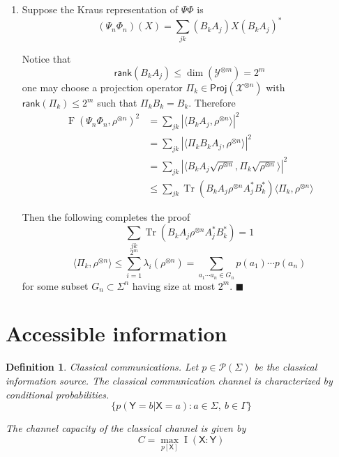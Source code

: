 \documentclass[aps,pra,onecolumn,notitlepage,superscriptaddress]{revtex4-1}
\newcommand{\reg}[1]{\mathsf{#1}}
\newcommand{\spc}[1]{\mathcal{#1}}
\newcommand{\Proj}{\mathsf{Proj}}
\newcommand{\rank}{\mathsf{rank}}
\def\>{\rangle}
\def\<{\langle}
\newcommand{\Tr}{\operatorname{Tr}}
\newcommand{\op}[1]{\operatorname{#1}}
\newtheorem{defi}{Definition}
\def\qed{$\blacksquare$ \newline}
\begin{document}
\begin{enumerate}
        \item Suppose the Kraus representation of $\Psi\Phi$ is
        \begin{equation}
            (\Psi_n\Phi_n) (X) = \sum_{jk} (B_kA_j) X (B_kA_j)^*
        \end{equation}

        Notice that
        \begin{equation}
            \rank(B_kA_j) \leq \dim(\spc Y^{\otimes m}) = 2^m
        \end{equation}
        one may choose a projection operator $\Pi_k \in \Proj(\spc X^{\otimes n})$ with $\rank(\Pi_k) \leq 2^m$ such that
        $\Pi_k B_k = B_k$. Therefore
        \begin{align*}
            \op F(\Psi_n\Phi_n, \rho^{\otimes n})^2 
            &= \sum_{jk} |\< B_kA_j, \rho^{\otimes n} \>|^2 \\
            &= \sum_{jk} |\< \Pi_kB_kA_j, \rho^{\otimes n} \>|^2 \\
            &= \sum_{jk} |\< B_kA_j\sqrt{\rho^{\otimes n}}, \Pi_k\sqrt{\rho^{\otimes n}} \>|^2 \\
            &\leq \sum_{jk} \Tr(B_kA_j \rho^{\otimes n} A_j^*B_k^*) \< \Pi_k, \rho^{\otimes n} \>
        \end{align*}

        Then the following completes the proof
        \begin{equation}
            \sum_{jk} \Tr(B_kA_j \rho^{\otimes n} A_j^* B_k^*) = 1
        \end{equation}
        \begin{equation}
            \< \Pi_k, \rho^{\otimes n} \> \leq \sum_{i=1}^{2^m} \lambda_i(\rho^{\otimes n}) = \sum_{a_1\cdots a_n \in G_n} p(a_1)\cdots p(a_n)
        \end{equation}
        for some subset $G_n \subset \Sigma^n$ having size at most $2^m$. \qed
    \end{enumerate}

    \section{Accessible information}
    \begin{defi}
        Classical communications. Let $p \in \spc P(\Sigma)$ be the classical information source. The classical communication channel is characterized by conditional probabilities.
        \begin{equation}
            \{ p(\reg Y = b | \reg X = a) : a \in \Sigma, \ b \in \Gamma \}
        \end{equation}
        
        The channel capacity of the classical channel is given by
        \begin{equation}
            C = \max_{p[\reg X]} \op I(\reg X : \reg Y)
        \end{equation}
    \end{defi}
\end{document}
